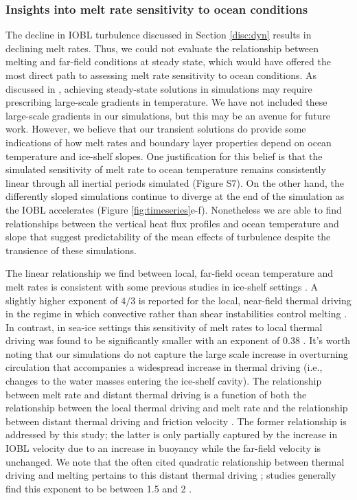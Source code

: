 \documentclass[draft]{agujournal2019}
\begin{document}
\subsubsection{Insights into melt rate sensitivity to ocean conditions}\label{disc:prm_sens}

The decline in IOBL turbulence discussed in Section \ref{disc:dyn} results in declining melt rates. Thus, we could not evaluate the relationship between melting and far-field conditions at steady state, which would have offered the most direct path to assessing melt rate sensitivity to ocean conditions. As discussed in , achieving steady-state solutions in simulations may require prescribing large-scale gradients in temperature. We have not included these large-scale gradients in our simulations, but this may be an avenue for future work. However, we believe that our transient solutions do provide some indications of how melt rates and boundary layer properties depend on ocean temperature and ice-shelf slopes. One justification for this belief is that the simulated sensitivity of melt rate to ocean temperature remains consistently linear through all inertial periods simulated (Figure S7). On the other hand, the differently sloped simulations continue to diverge at the end of the simulation as the IOBL accelerates (Figure \ref{fig:timeseries}e-f). Nonetheless we are able to find relationships between the vertical heat flux profiles and ocean temperature and slope that suggest predictability of the mean effects of turbulence despite the transience of these simulations.

The linear relationship we find between local, far-field ocean temperature and melt rates is consistent with some previous studies in ice-shelf settings \cite{rignot_rapid_2002, holland_response_2008, vreugdenhil_stratification_2019}. A slightly higher exponent of $4/3$ is reported for the local, near-field thermal driving in the regime in which convective rather than shear instabilities control melting \cite{kerr_dissolution_2015}. In contrast, in sea-ice settings this sensitivity of melt rates to local thermal driving was found to be significantly smaller with an exponent of 0.38 \cite{ramudu_large_2018}. It's worth noting that our simulations do not capture the large scale increase in overturning circulation that accompanies a widespread increase in thermal driving (i.e., changes to the water masses entering the ice-shelf cavity). The relationship between melt rate and distant thermal driving is a function of both the relationship between the local thermal driving and melt rate and the relationship between distant thermal driving and friction velocity \cite{holland_response_2008}. The former relationship is addressed by this study; the latter is only partially captured by the increase in IOBL velocity due to an increase in buoyancy while the far-field velocity is unchanged. We note that the often cited quadratic relationship between thermal driving and melting pertains to this distant thermal driving  \cite{holland_response_2008}; studies generally find this exponent to be between 1.5 and 2 \cite{little_how_2009, jourdain_ocean_2017, favier_assessment_2019}. 
\end{document}
